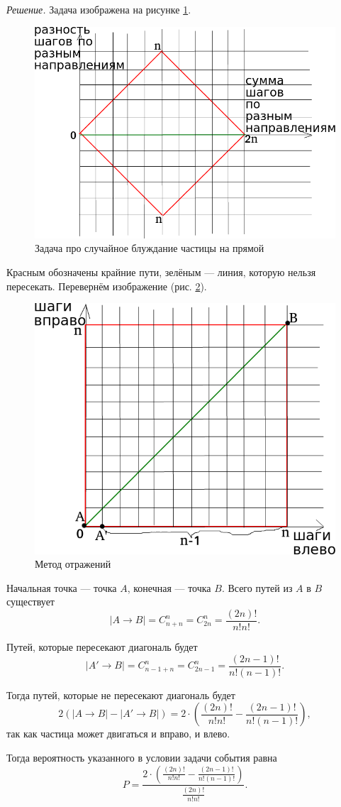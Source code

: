 \textit{Решение.} Задача изображена на рисунке \ref{fig:34}.

\begin{figure}[h!]
  \centering
  \includegraphics[width=.4\textwidth]{./pictures/t1v3_4.png}
  \caption{Задача про случайное блуждание частицы на прямой}
  \label{fig:34}
\end{figure}

Красным обозначены крайние пути, зелёным --- линия, которую нельзя пересекать.
Перевернём изображение (рис. \ref{fig:341}).

\begin{figure}[h!]
  \centering
  \includegraphics[width=.4\textwidth]{./pictures/t1v3_41.png}
  \caption{Метод отражений}
  \label{fig:341}
\end{figure}

Начальная точка --- точка $A$, конечная --- точка $B$.
Всего путей из $A$ в $B$ существует
$$ \left| A \rightarrow B \right| =
C_{n+n}^n =
C_{2n}^n =
\frac{ \left( 2n \right)!}{n!n!}.$$

Путей, которые пересекают диагональ будет
$$ \left| A' \rightarrow B \right| =
C_{n-1+n}^n =
C_{2n-1}^n =
\frac{ \left( 2n-1 \right)!}{n! \left( n-1 \right)!}.$$

Тогда путей, которые не пересекают диагональ будет
$$2 \left( \left| A \rightarrow B \right| - \left| A' \rightarrow B \right| \right) =
2 \cdot \left( \frac{ \left( 2n \right)!}{n!n!} - \frac{ \left( 2n-1 \right)!}{n! \left( n-1 \right)!} \right),$$
так как частица может двигаться и вправо, и влево.

Тогда вероятность указанного в условии задачи события равна
$$P =
\frac{2 \cdot \left( \frac{ \left( 2n \right)!}{n!n!} - \frac{ \left( 2n-1 \right)!}{n! \left( n-1 \right)!} \right) }{ \frac{ \left( 2n \right)!}{n!n!} }.$$

